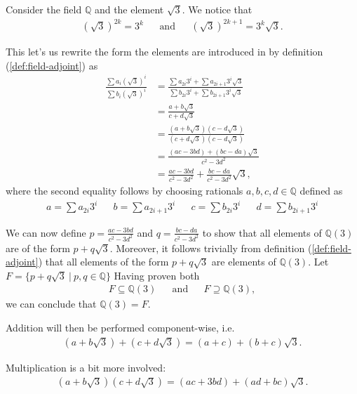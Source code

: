 \newpage
\begin{exmp}
  Consider the field $\mathbb Q$  and the element $\sqrt 3$. We notice that 
  \begin{align*}
    {(\sqrt 3)} ^{2k} = 3 ^k && \text{and} && {(\sqrt 3)} ^{2k + 1} = 3 ^k \sqrt 3.
  \end{align*}

  This let's us rewrite the form the elements are introduced in by definition (\ref{def:field-adjoint}) as
  \begin{align*}
    \frac{\sum a _i {(\sqrt 3)} ^i }{\sum b _i {(\sqrt 3)} ^i }
    &= \frac{\sum a _{2i} 3 ^i + \sum a_{2i + 1} 3 ^i \sqrt 3}{\sum b _{2i} 3 ^i + \sum b_{2i + 1} 3 ^i \sqrt 3} 
    \\&= \frac{a + b\sqrt 3}{c + d\sqrt 3}
    \\&= \frac{(a + b \sqrt 3)(c - d \sqrt 3)}{(c + d \sqrt 3)(c - d \sqrt 3)}
    \\&= \frac{(ac - 3bd) + (bc - da) \sqrt 3}{c ^2 - 3 d ^2 }
    \\&= \frac{ac - 3bd}{c ^2 - 3 d ^2 } + \frac{bc - da}{c ^2 - 3 d ^2 } \sqrt 3,
  \end{align*}
  where the second equality follows by choosing rationals $a, b, c, d \in \mathbb{Q}$ defined as
  \begin{align*}
    a = \sum a _{2i} 3 ^i && b = \sum a _{2i + 1} 3 ^i  &&
    c = \sum b _{2i} 3 ^i && d = \sum b _{2i + 1} 3 ^i 
  \end{align*}

  We can now define $p = \frac{ac - 3bd}{c ^2 - 3 d ^2 }$ and $q = \frac{bc - da}{c ^2 - 3 d ^2 }$ to show that all elements of $ \mathbb{Q} (3)$ are of the form $p + q \sqrt 3$. Moreover, it follows trivially from  definition (\ref{def:field-adjoint}) that all elements of the form $p + q \sqrt 3$ are elements of $\mathbb{Q} (3)$. Let $F = \{p + q \sqrt 3 \:|\: p, q \in \mathbb{Q} \}$ Having proven both 
  \begin{align*}
     F \subseteq \mathbb{Q} (3) && \text{and} && F \supseteq \mathbb{Q} (3),
  \end{align*}
 we can conclude that $\mathbb{Q} (3)  = F$.

  Addition will then be performed component-wise, i.e. 
  \begin{align*}
  (a + b \sqrt 3) + (c + d \sqrt 3) = (a + c)  + (b + c) \sqrt 3.
  \end{align*}

  Multiplication is a bit more involved:
  \begin{align*}
    (a + b \sqrt 3)(c + d \sqrt 3) = (ac + 3bd) + (ad + bc) \sqrt 3.
  \end{align*}


\end{exmp}

